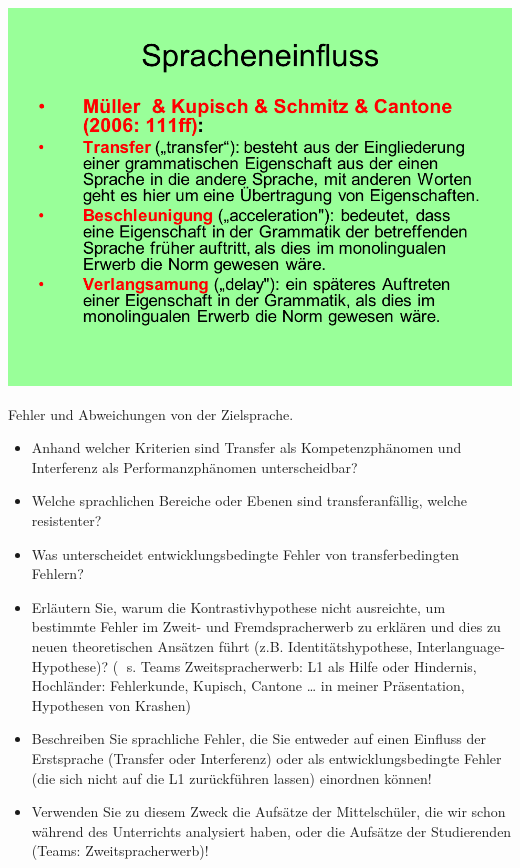 \documentclass[
  letterpaper,
]{scrbook}
\begin{document}
\includegraphics[width=1\textwidth,height=\textheight]{./pictures/02_Spracheneinfluss_Sprachentrennung/Diapozitiv25.PNG}

Fehler und Abweichungen von der Zielsprache.

\begin{itemize}
\item
  Anhand welcher Kriterien sind Transfer als Kompetenzphänomen und
  Interferenz als Performanzphänomen unterscheidbar?
\item
  Welche sprachlichen Bereiche oder Ebenen sind transferanfällig, welche
  resistenter?
\item
  Was unterscheidet entwicklungsbedingte Fehler von transferbedingten
  Fehlern?
\item
  Erläutern Sie, warum die Kontrastivhypothese nicht ausreichte, um
  bestimmte Fehler im Zweit- und Fremdspracherwerb zu erklären und dies
  zu neuen theoretischen Ansätzen führt (z.B. Identitätshypothese,
  Interlanguage-Hypothese)? ( s. Teams Zweitspracherwerb: L1 als Hilfe
  oder Hindernis, Hochländer: Fehlerkunde, Kupisch, Cantone \ldots{} in
  meiner Präsentation, Hypothesen von Krashen)
\item
  Beschreiben Sie sprachliche Fehler, die Sie entweder auf einen
  Einfluss der Erstsprache (Transfer oder Interferenz) oder als
  entwicklungsbedingte Fehler (die sich nicht auf die L1 zurückführen
  lassen) einordnen können!
\item
  Verwenden Sie zu diesem Zweck die Aufsätze der Mittelschüler, die wir
  schon während des Unterrichts analysiert haben, oder die Aufsätze der
  Studierenden (Teams: Zweitspracherwerb)!
\end{itemize}
\end{document}
